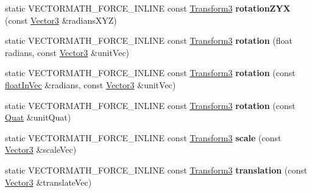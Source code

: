 \begin{DoxyCompactItemize}
\mbox{\label{classVectormath_1_1Aos_1_1Transform3_aad365810aad9f102e9cea050d30e6859}} 
static V\+E\+C\+T\+O\+R\+M\+A\+T\+H\+\_\+\+F\+O\+R\+C\+E\+\_\+\+I\+N\+L\+I\+NE const \hyperlink{classVectormath_1_1Aos_1_1Transform3}{Transform3} {\bfseries rotation\+Z\+YX} (const \hyperlink{classVectormath_1_1Aos_1_1Vector3}{Vector3} \&radians\+X\+YZ)
\item 
\mbox{\label{classVectormath_1_1Aos_1_1Transform3_a828430d04b8d99b8c6b6540d198834d9}} 
static V\+E\+C\+T\+O\+R\+M\+A\+T\+H\+\_\+\+F\+O\+R\+C\+E\+\_\+\+I\+N\+L\+I\+NE const \hyperlink{classVectormath_1_1Aos_1_1Transform3}{Transform3} {\bfseries rotation} (float radians, const \hyperlink{classVectormath_1_1Aos_1_1Vector3}{Vector3} \&unit\+Vec)
\item 
\mbox{\label{classVectormath_1_1Aos_1_1Transform3_a70f51aa5d832fe8ef0bc9d231a946207}} 
static V\+E\+C\+T\+O\+R\+M\+A\+T\+H\+\_\+\+F\+O\+R\+C\+E\+\_\+\+I\+N\+L\+I\+NE const \hyperlink{classVectormath_1_1Aos_1_1Transform3}{Transform3} {\bfseries rotation} (const \hyperlink{classVectormath_1_1floatInVec}{float\+In\+Vec} \&radians, const \hyperlink{classVectormath_1_1Aos_1_1Vector3}{Vector3} \&unit\+Vec)
\item 
\mbox{\label{classVectormath_1_1Aos_1_1Transform3_a477f22e7a915190292f72b2a1ba5a42a}} 
static V\+E\+C\+T\+O\+R\+M\+A\+T\+H\+\_\+\+F\+O\+R\+C\+E\+\_\+\+I\+N\+L\+I\+NE const \hyperlink{classVectormath_1_1Aos_1_1Transform3}{Transform3} {\bfseries rotation} (const \hyperlink{classVectormath_1_1Aos_1_1Quat}{Quat} \&unit\+Quat)
\item 
\mbox{\label{classVectormath_1_1Aos_1_1Transform3_a6edc040c9a3f332f1ca9905c137f3bcc}} 
static V\+E\+C\+T\+O\+R\+M\+A\+T\+H\+\_\+\+F\+O\+R\+C\+E\+\_\+\+I\+N\+L\+I\+NE const \hyperlink{classVectormath_1_1Aos_1_1Transform3}{Transform3} {\bfseries scale} (const \hyperlink{classVectormath_1_1Aos_1_1Vector3}{Vector3} \&scale\+Vec)
\item 
\mbox{\label{classVectormath_1_1Aos_1_1Transform3_a01963970d9591b93326d61284a7b1f41}} 
static V\+E\+C\+T\+O\+R\+M\+A\+T\+H\+\_\+\+F\+O\+R\+C\+E\+\_\+\+I\+N\+L\+I\+NE const \hyperlink{classVectormath_1_1Aos_1_1Transform3}{Transform3} {\bfseries translation} (const \hyperlink{classVectormath_1_1Aos_1_1Vector3}{Vector3} \&translate\+Vec)
\end{DoxyCompactItemize}


